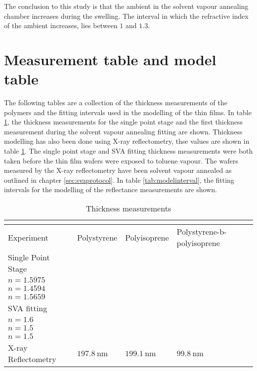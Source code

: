 \documentclass[MasterThesisMain.tex]{subfiles}
\begin{document}
The conclusion to this study is that the ambient in the solvent vapour annealing chamber increases during the swelling. The interval in which the refractive index of the ambient increases, lies between $1$ and $1.3$. 

\section{Measurement table and model table}
The following tables are a collection of the thickness measurements of the polymers and the fitting intervals used in the modelling of the thin films. In table \ref{tab:thicknessmeasurement}, the thickness measurements for the single point stage and the first thickness measurement during the solvent vapour annealing fitting are shown. Thickness modelling has also been done using X-ray reflectometry, thse values are shown in table \ref{tab:thicknessmeasurement}. The single point stage and SVA fitting thickness measurements were both taken before the thin film wafers were exposed to toluene vapour. The wafers measured by the X-ray reflectometry have been solvent vapour annealed as outlined in chapter \ref{sec:svaprotocol}. In table \ref{tab:modelinterval}, the fitting intervals for the modelling of the reflectance measurements are shown.   

\begin{table}[H]
	\caption{Thickness measurements}
\begin{tabular}{ |p{4cm}||p{3cm}|p{3cm}|p{3cm}| }
 \hline
 \multicolumn{4}{|c|}{} \\
 \hline
 Experiment & Polystyrene & Polyisoprene & Polystyrene-b-polyisoprene\\
 \hline
 Single Point Stage & \makecell{ $\SI{275.5}{\nano\meter}$ \\ $n=1.5975$} & \makecell{$\SI{301}{\nano\meter}$ \\ $n=1.4594$ } & \makecell{$\SI{97.3}{\nano\meter}$ \\ $n=1.5659$} \\
 \hline
 SVA fitting & \makecell{$\SI{275}{\nano\meter}$ \\ $n=1.6$} & \makecell{$\SI{285}{\nano\meter}$ \\ $n=1.5$} &\makecell{$\SI{106}{\nano\meter}$ \\ $n=1.5$} \\
 \hline
 X-ray Reflectometry & $\SI{197.8}{\nano\meter}$ & $\SI{199.1}{\nano\meter}$ & $\SI{99.8}{\nano\meter}$ \\  
 \hline
\end{tabular}
\label{tab:thicknessmeasurement}
\end{table}
\end{document}
